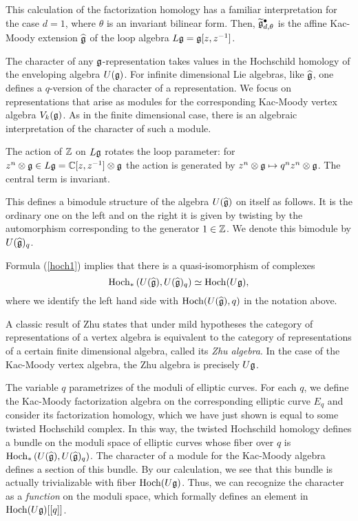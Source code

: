 This calculation of the factorization homology has a familiar interpretation for the case $d=1$, where $\theta$ is an invariant bilinear form. 
Then, $\widetilde{\mathfrak g}^\bullet_{d,\theta}$ is the affine Kac-Moody extension $\widehat{\mathfrak g}$ of the loop algebra $L\mathfrak g = \mathfrak g [z,z^{-1}]$. 

The character of any $\mathfrak g$-representation takes values in the Hochschild homology of the enveloping algebra $U(\mathfrak g)$. 
For infinite dimensional Lie algebras, like $\widehat{\mathfrak g}$, one defines a $q$-version of the character of a representation.
We focus on representations that arise as modules for the corresponding Kac-Moody vertex algebra $V_{k}(\mathfrak g)$. 
As in the finite dimensional case, there is an algebraic interpretation of the character of such a module. 

The action of $\mathbb Z$ on $L\mathfrak g$ rotates the loop parameter: for $z^n \otimes \mathfrak g \in L \mathfrak g = \mathbb C[z,z^{-1}] \otimes \mathfrak g$ the action is generated by $z^n \otimes \mathfrak g \mapsto q^n z^n \otimes \mathfrak g$. 
The central term is invariant. 

This defines a bimodule structure of the algebra $U(\widehat{\mathfrak g})$ on itself as follows.
It is the ordinary one on the left and on the right it is given by twisting by the automorphism corresponding to the generator $1 \in \mathbb Z$. 
We denote this bimodule by $U(\widehat{\mathfrak g})_{q}$.

Formula (\ref{hoch1}) implies that there is a quasi-isomorphism of complexes
\[
{\rm Hoch}_*\left(U(\widehat{\mathfrak g}), U(\widehat{\mathfrak g})_q \right) \simeq {\rm Hoch}(U \mathfrak g) ,
\]
where we identify the left hand side with ${\rm Hoch}(U(\widehat{\mathfrak g}), q)$ in the notation above. 

A classic result of Zhu \cite{Zhu} states that under mild hypotheses the category of representations of a vertex algebra is equivalent to the category of representations of a certain finite dimensional algebra, called its {\em Zhu algebra}. 
In the case of the Kac-Moody vertex algebra, the Zhu algebra is precisely $U\mathfrak g$. 

The variable $q$ parametrizes of the moduli of elliptic curves.
For each $q$, we define the Kac-Moody factorization algebra on the corresponding elliptic curve $E_q$ and consider its factorization homology, which we have just shown is equal to some twisted Hochschild complex.
In this way, the twisted Hochschild homology defines a bundle on the moduli space of elliptic curves whose fiber over $q$ is ${\rm Hoch}_*\left(U(\widehat{\mathfrak g}), U(\widehat{\mathfrak g})_q \right)$. 
The character of a module for the Kac-Moody algebra defines a section of this bundle. 
By our calculation, we see that this bundle is actually trivializable with fiber ${\rm Hoch}(U \mathfrak g)$.
Thus, we can recognize the character as a {\em function} on the moduli space, which formally defines an element in ${\rm Hoch}(U \mathfrak g) [[q]]$. 


